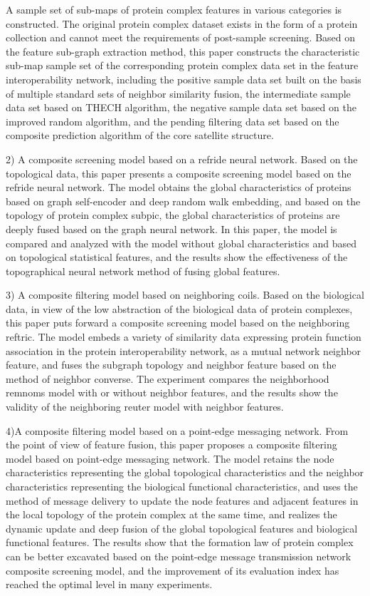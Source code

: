 \begin{eabstract}
  A sample set of sub-maps of protein complex features in various categories is constructed. The original protein complex dataset exists in the form of a protein collection and cannot meet the requirements of post-sample screening. Based on the feature sub-graph extraction method, this paper constructs the characteristic sub-map sample set of the corresponding protein complex data set in the feature interoperability network, including the positive sample data set built on the basis of multiple standard sets of neighbor similarity fusion, the intermediate sample data set based on THECH algorithm, the negative sample data set based on the improved random algorithm, and the pending filtering data set based on the composite prediction algorithm of the core satellite structure.


  2) A composite screening model based on a refride neural network. Based on the topological data, this paper presents a composite screening model based on the refride neural network. The model obtains the global characteristics of proteins based on graph self-encoder and deep random walk embedding, and based on the topology of protein complex subpic, the global characteristics of proteins are deeply fused based on the graph neural network. In this paper, the model is compared and analyzed with the model without global characteristics and based on topological statistical features, and the results show the effectiveness of the topographical neural network method of fusing global features.

  3) A composite filtering model based on neighboring coils. Based on the biological data, in view of the low abstraction of the biological data of protein complexes, this paper puts forward a composite screening model based on the neighboring reftric. The model embeds a variety of similarity data expressing protein function association in the protein interoperability network, as a mutual network neighbor feature, and fuses the subgraph topology and neighbor feature based on the method of neighbor converse. The experiment compares the neighborhood remnoms model with or without neighbor features, and the results show the validity of the neighboring reuter model with neighbor features.

  4)A composite filtering model based on a point-edge messaging network. From the point of view of feature fusion, this paper proposes a composite filtering model based on point-edge messaging network. The model retains the node characteristics representing the global topological characteristics and the neighbor characteristics representing the biological functional characteristics, and uses the method of message delivery to update the node features and adjacent features in the local topology of the protein complex at the same time, and realizes the dynamic update and deep fusion of the global topological features and biological functional features. The results show that the formation law of protein complex can be better excavated based on the point-edge message transmission network composite screening model, and the improvement of its evaluation index has reached the optimal level in many experiments.

\end{eabstract}

